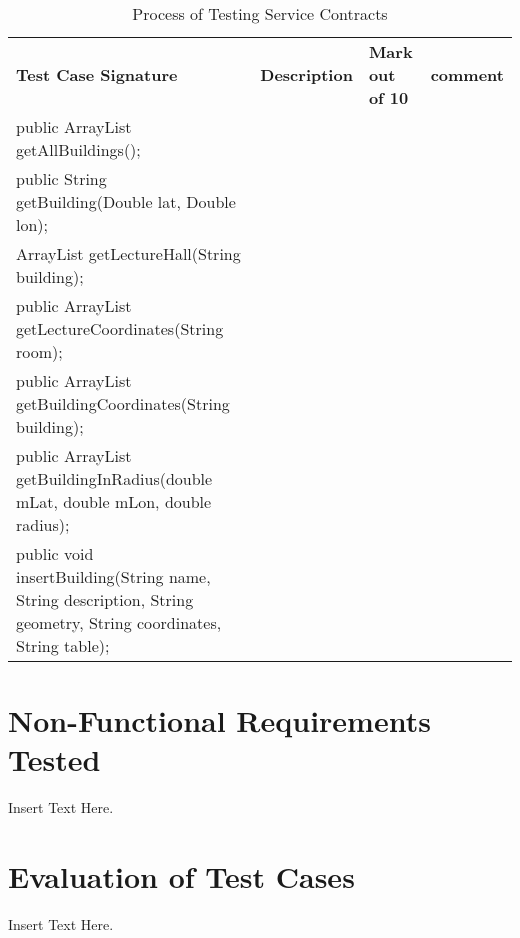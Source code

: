 \documentclass[12pt]{article}
\begin{document}
		 \begin{table}[]
		\centering
		\caption{Process of Testing Service Contracts}
		\label{my-label}
		\begin{tabular}{llll}
		\textbf{Test Case Signature}                                                                                    & 			\textbf{Description} & \textbf{Mark out of 10} & \textbf{comment} \\
		public ArrayList getAllBuildings();                                                                             &                      &                         &                  \\
		public String getBuilding(Double lat, Double lon);                                                              &                      &                         &                  \\
		ArrayList getLectureHall(String building);                                                                      &                      &                         &                  \\
		public ArrayList getLectureCoordinates(String room);                                                            &                      &                         &                  \\
		public ArrayList getBuildingCoordinates(String building);                                                       &                      &                         &                  \\
		public ArrayList getBuildingInRadius(double mLat, double mLon, double radius);                                  &                      &                         &                  \\
		public void insertBuilding(String name, String description, String geometry, String coordinates, String table); &                      &                         &                 
		\end{tabular}
		\end{table}



\section{Non-Functional Requirements Tested}
Insert Text Here.

\section{Evaluation of Test Cases}
Insert Text Here.
\end{document}

